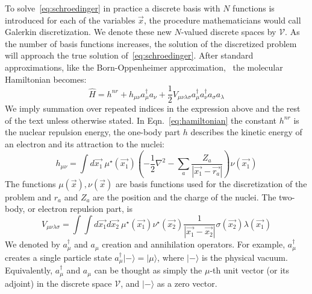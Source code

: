 To solve~\ref{eq:schroedinger} in practice a discrete basis with $N$ 
functions is introduced for each of the variables $\vec{x}$, the procedure 
mathematicians would call Galerkin discretization. We denote these new 
$N$-valued discrete spaces by $\mathcal{V}$. As the number of basis functions 
increases, the solution of the discretized problem will approach the true 
solution of~\ref{eq:schroedinger}. After standard approximations, like the 
Born-Oppenheimer approximation,~\cite{jensen2017introduction} the molecular 
Hamiltonian becomes:
%
\begin{equation}
 \hat{H} = h^{nr} + h_{\mu \nu} a^{\dagger}_{\mu} a_{\nu} + \frac{1}{2} V_{\mu 
\nu \lambda \sigma} a^{\dagger}_{\mu} a^{\dagger}_{\nu} a_{\sigma} a_{\lambda}
\label{eq:hamiltonian}
\end{equation}
%
We imply summation over repeated indices in the expression above and the rest 
of the text unless otherwise stated. In Eqn.~\ref{eq:hamiltonian} the constant 
$h^{nr}$ is the nuclear repulsion energy, the one-body part $h$ describes the 
kinetic energy of an electron and its attraction to the nuclei:
%
\begin{equation}
 h_{\mu \nu} = \int d\vec{x_{1}} ~ \mu^{\star}(\vec{x_{1}}) \left( - 
\frac{1}{2} \nabla^2 - \sum_{a} \frac{Z_{a}}{|\vec{x_{1}} - 
\vec{r_{a}}|} \right) \nu(\vec{x_{1}})
\end{equation}
% 
The functions $\mu(\vec{x}), \nu(\vec{x})$ are basis functions used for the 
discretization of the problem and $r_{a}$ and $Z_{a}$ are the 
position and the charge of the nuclei. The two-body, or electron repulsion 
part, is
%
\begin{equation}
 V_{\mu \nu \lambda \sigma} = \int \int d\vec{x_{1}} d\vec{x_{2}}~ 
\mu^{\star}(\vec{x_{1}}) \nu^{\star}(\vec{x_{2}}) 
\frac{1}{|\vec{x_{1}} - \vec{x_{2}}|} 
\sigma(\vec{x_{2}}) \lambda(\vec{x_{1}}) 
\end{equation}
% 
We denoted by $a^{\dagger}_{\mu}$ and $a_{\mu}$ creation and 
annihilation operators. For example, $a^{\dagger}_{\mu}$ creates a single 
particle state $a^{\dagger}_{\mu} | - \rangle = | \mu \rangle$, where $| - 
\rangle$ is the physical vacuum. Equivalently, $a^{\dagger}_{\mu}$ and 
$a_{\mu}$ can be thought as simply the $\mu$-th unit vector (or its adjoint) in 
the discrete space $\mathcal{V}$, and $| - \rangle$  as a zero vector.

